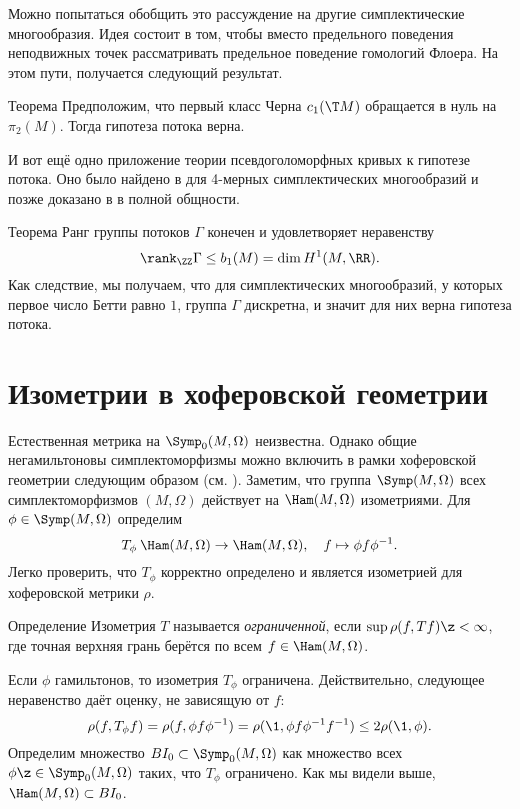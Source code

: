 Можно попытаться обобщить это рассуждение на другие симплектические многообразия.
Идея состоит в том, чтобы вместо предельного поведения неподвижных точек рассматривать предельное поведение гомологий Флоера.
На этом пути, получается следующий результат.


\begin{thm}{Теорема}\label{14.3.A}
Предположим, что первый класс Черна $c_1(\T M)$ обращается в нуль на $\pi_2(M)$.
Тогда гипотеза потока верна.
\end{thm}


И вот ещё одно приложение теории псевдоголоморфных кривых к гипотезе потока.
Оно было найдено в \cite{LMP2} для 4-мерных симплектических многообразий и позже доказано в \cite{McD2} в полной общности.

\begin{thm}{Теорема}\label{14.3.B}
Ранг группы потоков $\Gamma$ конечен и удовлетворяет неравенству
\[\rank_\ZZ \Gamma\le b_1(M) = \dim H^1(M,\RR).\]
Как следствие, мы получаем, что для симплектических многообразий, у которых первое число Бетти равно $1$, группа $\Gamma$ дискретна, и значит для них верна гипотеза потока.
\end{thm}

\section{Изометрии в хоферовской геометрии }

Естественная метрика на $\Symp_0(M,\Omega)$ неизвестна.
Однако общие негамильтоновы симплектоморфизмы можно включить в рамки хоферовской геометрии следующим образом (см. \cite{LP}).
Заметим, что группа $\Symp(M,\Omega)$ всех симплектоморфизмов $(M,\Omega)$ действует на $\Ham(M,\Omega)$ изометриями.
Для $\phi \in \Symp(M,\Omega)$ определим 
\[T_\phi\: \Ham(M,\Omega) \to \Ham(M,\Omega),
\quad
f \mapsto \phi f\phi^{-1}.\]
Легко проверить, что $T_\phi$ корректно определено и является изометрией для хоферовской метрики $\rho$.

\begin{ex*}{Определение}
Изометрия $T$ называется \emph{ограниченной}, если $\sup \rho(f, Tf)\z<\infty$, где точная верхняя грань берётся по всем $f\in\Ham(M,\Omega)$.
\end{ex*}


Если $\phi$ гамильтонов, то изометрия $T_\phi$ ограничена.
Действительно, следующее неравенство даёт оценку, не зависящую от $f$:
\[\rho(f,T_\phi f) = \rho(f,\phi f\phi^{-1}) = \rho(\1,\phi f\phi^{-1}f^{-1})\le 2\rho(\1, \phi).\]
Определим множество $BI_0 \subset \Symp_0(M,\Omega)$ как множество всех $\phi \z\in \Symp_0(M,\Omega)$ таких, что $T_\phi$ ограничено.
Как мы видели выше, $\Ham(M,\Omega)\subset BI_0$.

